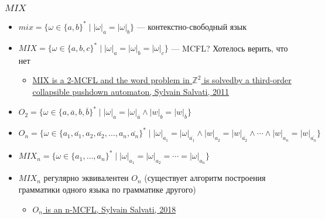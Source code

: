 \documentclass{beamer}
\begin{document}
\begin{frame}[fragile]
  
  \frametitle{$MIX$}
  \begin{itemize}
    \item $mix = \{\omega \in \{a,b\}^* \mid |\omega|_a = |\omega|_b \}$ --- контекстно-свободный язык

    \item $MIX = \{\omega \in \{a,b,c\}^* \mid |\omega|_a = |\omega|_b = |\omega|_c\}$ --- MCFL? Хотелось верить, что нет
    \begin{itemize}
      \item \href{https://hal.inria.fr/inria-00564552/document}{MIX is a 2-MCFL and the word problem in $\mathbb{Z}^2$ is solvedby a third-order collapsible pushdown automaton, Sylvain Salvati, 2011}
    \end{itemize}
    \pause
    \item $O_2=\{\omega \in \{a,\overline{a},b,\overline{b}\}^* \mid |\omega|_a=|\omega|_{\overline{a}} \wedge |w|_b=|w|_{\overline{b}}\}$

    \item $O_n=\{\omega \in \{a_1,\overline{a_1},a_2,\overline{a_2},\ldots,a_n,\overline{a_n}\}^* \mid |\omega|_{a_1}=|\omega|_{\overline{a_1}} \wedge |w|_{a_2}=|w|_{\overline{a_2}} \wedge \cdots \wedge |w|_{a_n}=|w|_{\overline{a_n}}\}$
    \item $MIX_n = \{\omega \in \{a_1,\ldots,a_n\}^* \mid |\omega|_{a_1} = |\omega|_{a_2} =\cdots = |\omega|_{a_n}\}$
    \pause
    \item $MIX_n$ регулярно эквивалентен $O_n$ (существует алгоритм построения грамматики одного языка по грамматике другого)
    \begin{itemize}
      \item \href{https://hal.archives-ouvertes.fr/hal-01771670/document}{$O_n$ is an n-MCFL, Sylvain Salvati, 2018}
    \end{itemize}
  \end{itemize}
\end{frame}
\end{document}
